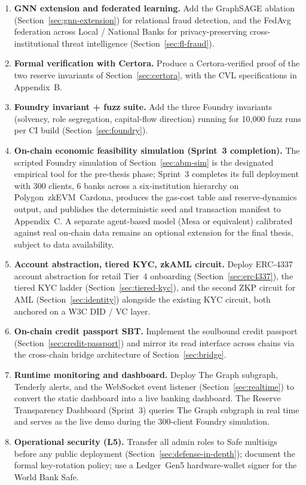 \documentclass[12pt,a4paper]{report}
\begin{document}
\begin{enumerate}[noitemsep]
\item \textbf{GNN extension and federated learning.} Add the GraphSAGE ablation (Section~\ref{sec:gnn-extension}) for relational fraud detection, and the FedAvg federation across Local / National Banks for privacy-preserving cross-institutional threat intelligence (Section~\ref{sec:fl-fraud}).
\item \textbf{Formal verification with Certora.} Produce a Certora-verified proof of the two reserve invariants of Section~\ref{sec:certora}, with the CVL specifications in Appendix~B.
\item \textbf{Foundry invariant + fuzz suite.} Add the three Foundry invariants (solvency, role segregation, capital-flow direction) running for 10{,}000 fuzz runs per CI build (Section~\ref{sec:foundry}).
\item \textbf{On-chain economic feasibility simulation (Sprint~3 completion).} The scripted Foundry simulation of Section~\ref{sec:abm-sim} is the designated empirical tool for the pre-thesis phase; Sprint~3 completes its full deployment with 300 clients, 6 banks across a six-institution hierarchy on Polygon~zkEVM~Cardona, produces the gas-cost table and reserve-dynamics output, and publishes the deterministic seed and transaction manifest to Appendix~C. A separate agent-based model (Mesa or equivalent) calibrated against real on-chain data remains an optional extension for the final thesis, subject to data availability.
\item \textbf{Account abstraction, tiered KYC, zkAML circuit.} Deploy ERC-4337 account abstraction for retail Tier~4 onboarding (Section~\ref{sec:erc4337}), the tiered KYC ladder (Section~\ref{sec:tiered-kyc}), and the second ZKP circuit for AML (Section~\ref{sec:identity}) alongside the existing KYC circuit, both anchored on a W3C DID / VC layer.
\item \textbf{On-chain credit passport SBT.} Implement the soulbound credit passport (Section~\ref{sec:credit-passport}) and mirror its read interface across chains via the cross-chain bridge architecture of Section~\ref{sec:bridge}.
\item \textbf{Runtime monitoring and dashboard.} Deploy The Graph subgraph, Tenderly alerts, and the WebSocket event listener (Section~\ref{sec:realtime}) to convert the static dashboard into a live banking dashboard. The Reserve Transparency Dashboard (Sprint~3) queries The Graph subgraph in real time and serves as the live demo during the 300-client Foundry simulation.
\item \textbf{Operational security (L5).} Transfer all admin roles to Safe multisigs before any public deployment (Section~\ref{sec:defense-in-depth}); document the formal key-rotation policy; use a Ledger~Gen5 hardware-wallet signer for the World Bank Safe.

\end{enumerate}
\end{document}
